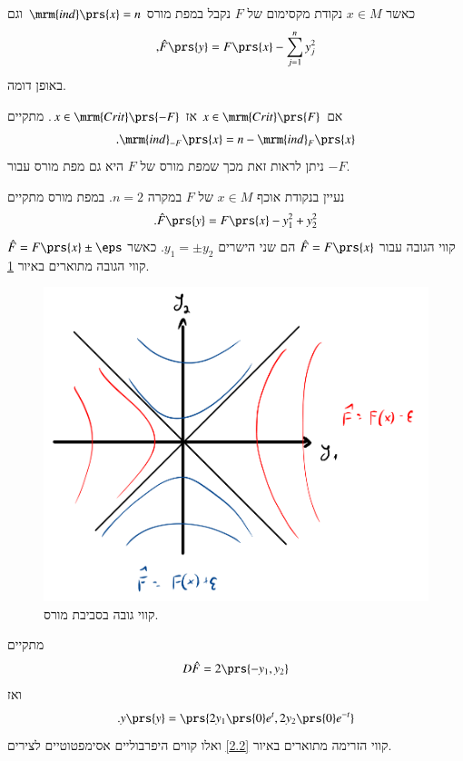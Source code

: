 \documentclass[a4paper,10pt,twoside,openany]{book}
\begin{document}
\begin{example}
כאשר
$x \in M$
נקודת מקסימום של
$F$
נקבל במפת מורס
$\mrm{ind}\prs{x} = n$
וגם
\[\text{,} \hat{F}\prs{y} = F\prs{x} - \sum_{j = 1}^n y_j^2\]
באופן דומה.
\end{example}

\begin{remark}
אם
$x \in \mrm{Crit}\prs{F}$
אז
$x \in \mrm{Crit}\prs{-F}$.
מתקיים
\[\text{.} \mrm{ind}_{-F}\prs{x} = n - \mrm{ind}_F\prs{x}\]
ניתן לראות זאת מכך שמפת מורס של
$F$
היא גם מפת מורס עבור
$-F$.
\end{remark}

\begin{example}
נעיין בנקודת אוכף
$x \in M$
של
$F$
במקרה
$n = 2$.
במפת מורס מתקיים
\[\text{.} \hat{F}\prs{y} = F\prs{x} - y_1^2 + y_2^2\]
קווי הגובה עבור
$\hat{F} = F\prs{x}$
הם שני הישרים
$y_1 = \pm y_2$.
כאשר
$\hat{F} = F\prs{x} \pm \eps$
קווי הגובה מתוארים באיור
\ref{2.1}.

\begin{figure}
\centering
\includegraphics[scale=0.5]{sources/2.1}
\caption{קווי גובה בסביבת מורס.}
\label{2.1}
\end{figure}

מתקיים
\[D \hat{F} = 2 \prs{-y_1, y_2}\]
ואז
\[\text{.} y\prs{y} = \prs{2y_1\prs{0} e^t, 2 y_2\prs{0} e^{-t}}\]
קווי הזרימה מתוארים באיור
\ref{2.2}
ואלו קווים היפרבוליים אסימפטוטיים לצירים.


\end{example}
\end{document}
